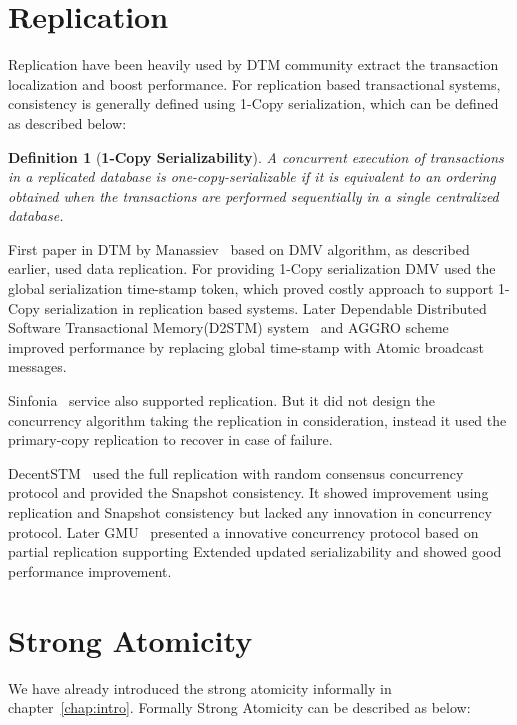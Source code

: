 \documentclass[12pt,english]{report}
\newtheorem{definition}{Definition}[section]
\begin{document}
\section{Replication}
Replication have been heavily used by DTM community extract the transaction localization and boost performance. For replication based transactional systems, consistency is generally defined using 1-Copy serialization, which can be defined as described below:

\begin{definition}[\textbf{1-Copy Serializability}]
A concurrent execution of transactions in a replicated database is one-copy-serializable if it is equivalent  to an ordering obtained when the transactions are performed sequentially in a single centralized database.~\cite{bornea2011one}
\end{definition}

First paper in DTM by Manassiev~\cite{Manassiev:2006:EDV:1122971.1123002} based on DMV algorithm, as described earlier, used data replication. For providing 1-Copy serialization DMV used the global serialization time-stamp token, which proved costly approach to support 1-Copy serialization in replication based systems. Later Dependable Distributed Software Transactional Memory(D2STM) system~\cite{D2STM:5368778} and AGGRO scheme~\cite{AGGRO:5598236} improved performance by replacing global time-stamp with Atomic broadcast messages.  

Sinfonia~\cite{Aguilera:2009:SNP:1629087.1629088} service also supported replication. But it did not design the concurrency algorithm taking the replication in consideration, instead it used the primary-copy replication to recover in case of failure. 

DecentSTM~\cite{DecentSTM:5470446} used the full replication with random consensus concurrency protocol and provided the  Snapshot consistency. It showed improvement using replication and Snapshot consistency but lacked any innovation in concurrency protocol. Later GMU~\cite{GMU:peluso2012scalability} presented a innovative concurrency protocol based on partial replication supporting Extended updated serializability and showed good performance improvement. 

\section{Strong Atomicity}
We have already introduced the strong atomicity informally in chapter~\ref{chap:intro}. Formally Strong Atomicity can be described as below:
\end{document}
